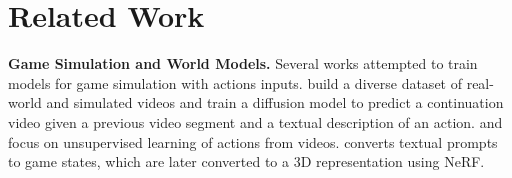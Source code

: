 \documentclass{article} %
\begin{document}
\begin{table}[t]
\caption{\textbf{Performance on Different Difficulty Levels.} We compare the performance of models trained using Agent-generated and Random-generated data across easy, medium, and hard splits of the dataset. Easy and medium have 112 items, hard has 232 items. Metrics are computed for each trajectory on a single frame after 3 seconds.
\label{table:difficulty_split_performance}}
\centering
\vspace{0.05in}
\end{table}


\section{Related Work}
\label{related_work}

\textbf{Game Simulation and World Models.} Several works attempted to train models for game simulation with actions inputs. \cite{yang2023learning} build a diverse dataset of real-world and simulated videos and train a diffusion model to predict a continuation video given a previous video segment and a textual description of an action. \cite{menapace2021playablevideogeneration} and \cite{bruce2024genie} focus on unsupervised learning of actions from videos. \cite{Menapace_2024} converts textual prompts to game states, which are later converted to a 3D representation using NeRF.
\end{document}
